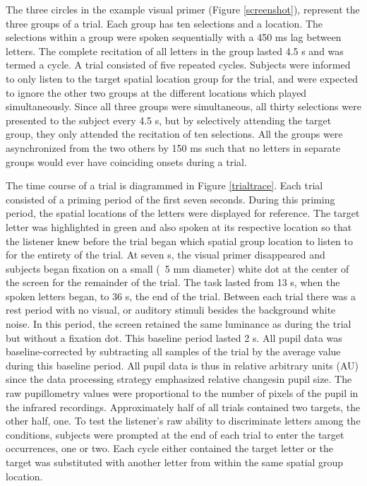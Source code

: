 \documentclass[10pt]{article}
\begin{document}
The three circles in the example visual primer (Figure
\ref{screenshot}), represent the three groups of a trial.
Each group has ten selections and a location.  The selections
within a group were spoken sequentially with a 450 ms lag
between letters.  The complete recitation of all letters in
the group lasted 4.5 s and was termed a cycle.  A trial
consisted of five repeated cycles. Subjects were informed to
only listen to the target spatial location group for the
trial, and were expected to ignore the other two groups at the
different locations which played simultaneously. Since all
three groups were simultaneous, all thirty selections were
presented to the subject every 4.5 s, but by selectively
attending the target group, they only attended the recitation
of ten selections. All the groups were asynchronized from the
two others by 150 ms such that no letters in separate groups
would ever have coinciding onsets during a trial.

The time course of a trial is diagrammed in Figure \ref{trialtrace}.
Each trial consisted of a priming period of the first seven seconds.
During this priming period, the spatial locations of the letters
were displayed for reference.  The target letter was highlighted in
green and also spoken at its respective location so that the
listener knew before the trial began which spatial group location to
listen to for the entirety of the trial. At seven s, the visual
primer disappeared and subjects began fixation on a small (~5 mm
diameter) white dot at the center of the screen for the remainder of
the trial.  The task lasted from 13 s, when the spoken letters
began, to 36 s, the end of the trial.  Between each trial there was a rest
period with no visual, or auditory stimuli besides the background
white noise.  In this period, the screen retained the same luminance
as during the trial but without a fixation dot. This baseline period
lasted 2 s.  All pupil data was baseline-corrected by
subtracting all samples of the trial by the average value during
this baseline period.  All pupil data is thus in relative arbitrary units
(AU) since the data processing strategy emphasized relative
changesin pupil size.  The raw pupillometry values were proportional
to the number of pixels of the pupil in the infrared recordings.
Approximately half of all trials contained two targets, the other
half, one. To test the listener's raw ability to discriminate letters
among the conditions, subjects were prompted at the end of each
trial to enter the target occurrences, one or two. Each cycle either
contained the target letter or the target was substituted with
another letter from within the same spatial group location.
\end{document}
